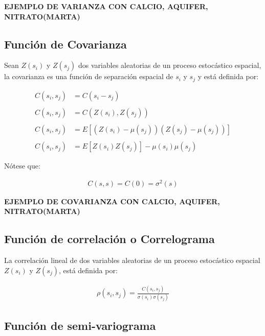\documentclass[
]{book}
\begin{document}
\textbf{EJEMPLO DE VARIANZA CON CALCIO, AQUIFER, NITRATO(MARTA)}

\hypertarget{funciuxf3n-de-covarianza}{%
\subsection{Función de Covarianza}\label{funciuxf3n-de-covarianza}}

Sean \(Z(s_i)\) y \(Z(s_j)\) dos variables aleatorias de un proceso estocástico espacial, la covarianza es una función de separación espacial de \(s_i\) y \(s_j\) y está definida por:

\begin{align*}
  C(s_i,s_j)&=C(s_i-s_j)\\ \\
  C(s_i,s_j)&=C(Z(s_i),Z(s_j))\\ \\
  C(s_i,s_j)&=E[(Z(s_i)-\mu(s_j))(Z(s_j)-\mu(s_j))]\\ \\
  C(s_i,s_j)&=E[Z(s_i)Z(s_j)]-\mu(s_i)\mu(s_j)
\end{align*}

Nótese que:

\begin{align*}
  C(s,s)=C(0)=\sigma^2(s)  
\end{align*}

\textbf{EJEMPLO DE COVARIANZA CON CALCIO, AQUIFER, NITRATO(MARTA)}

\hypertarget{funciuxf3n-de-correlaciuxf3n-o-correlograma}{%
\subsection{Función de correlación o Correlograma}\label{funciuxf3n-de-correlaciuxf3n-o-correlograma}}

La correlación lineal de dos variables aleatorias de un proceso estocástico espacial \(Z(s_i)\) y \(Z(s_j)\), está definida por:

\begin{align*}
  \rho(s_i,s_j)=\frac{C(s_i,s_j)}{\sigma(s_i)\sigma(s_j)}  
\end{align*}

\hypertarget{funciuxf3n-de-semi-variograma}{%
\subsection{Función de semi-variograma}\label{funciuxf3n-de-semi-variograma}}
\end{document}
